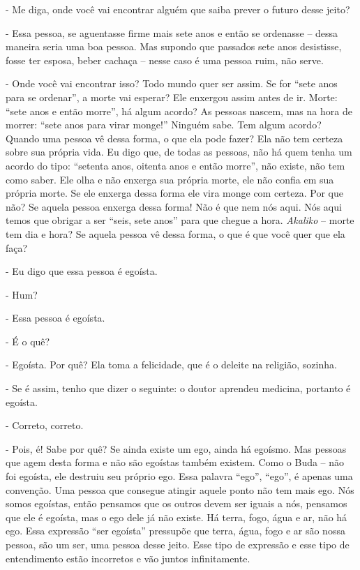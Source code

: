 - Me diga, onde você vai encontrar alguém que saiba prever o
futuro desse jeito?

- Essa pessoa, se aguentasse firme mais sete anos e então se
ordenasse – dessa maneira seria uma boa pessoa. Mas supondo que
passados sete anos desistisse, fosse ter esposa, beber cachaça – nesse
caso é uma pessoa ruim, não serve.

- Onde você vai encontrar isso? Todo mundo quer ser assim. Se for
“sete anos para se ordenar”, a morte vai esperar? Ele enxergou assim
antes de ir. Morte: “sete anos e então morre”, há algum acordo? As
pessoas nascem, mas na hora de morrer: “sete anos para virar monge!”
Ninguém sabe. Tem algum acordo? Quando uma pessoa vê dessa forma, o que
ela pode fazer? Ela não tem certeza sobre sua própria vida. Eu digo
que, de todas as pessoas, não há quem tenha um acordo do tipo: “setenta
anos, oitenta anos e então morre”, não existe, não tem como saber. Ele
olha e não enxerga sua própria morte, ele não confia em sua própria
morte. Se ele enxerga dessa forma ele vira monge com certeza. Por que
não? Se aquela pessoa enxerga dessa forma! Não é que nem nós aqui. Nós
aqui temos que obrigar a ser “seis, sete anos” para que chegue a hora.
\textit{Akaliko} – morte tem dia e hora? Se aquela pessoa vê dessa
forma, o que é que você quer que ela faça? 

- Eu digo que essa pessoa é egoísta. 

- Hum?

- Essa pessoa é egoísta.

- É o quê?

- Egoísta. Por quê? Ela toma a felicidade, que é o deleite na
religião, sozinha. 

- Se é assim, tenho que dizer o seguinte: o doutor aprendeu
medicina, portanto é egoísta.

- Correto, correto.

- Pois, é! Sabe por quê? Se ainda existe um ego, ainda há egoísmo.
Mas pessoas que agem desta forma e não são egoístas também existem.
Como o Buda – não foi egoísta, ele destruiu seu próprio ego. Essa
palavra “ego”, “ego”, é apenas uma convenção. Uma pessoa que consegue
atingir aquele ponto não tem mais ego. Nós somos egoístas, então
pensamos que os outros devem ser iguais a nós, pensamos que ele é
egoísta, mas o ego dele já não existe. Há terra, fogo, água e ar, não
há ego. Essa expressão “ser egoísta” pressupõe que terra, água, fogo e
ar são nossa pessoa, são um ser, uma pessoa desse jeito. Esse tipo de
expressão e esse tipo de entendimento estão incorretos e vão juntos
infinitamente. 

